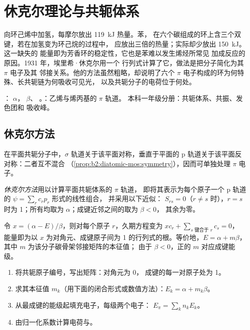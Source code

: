 \chapter{休克尔理论与共轭体系}\label{ch:b2:huckel}

向环己烯中加氢，每摩尔放出 \qty{119}{kJ} 热量。苯，
在六个碳组成的环上含三个双键，若在加氢变为环己烷的过程中，
应放出三倍的热量；实际却少放出 \qty{150}{kJ}。这一缺失的
能量即为芳香环的稳定性，它也是苯难以发生烯烃所常见
加成反应的原因。1931 年，埃里希·休克尔用一个
行列式计算了它，做法是把分子简化为其 $\pi$ 电子及其
邻接关系。他的方法虽然粗略，却说明了六个 $\pi$
电子构成的环为何特殊、长共轭链为何吸收可见光，
以及共轭分子的电荷位于何处。

\begin{recall}
： $\alpha$， $\beta$、
。：乙烯与烯丙基的 $\pi$ 轨道。
本科一年级分册：共轭体系、共振、发色团和
吸收峰。
\end{recall}

\section{休克尔方法}

在平面共轭分子中，$\sigma$ 轨道关于该平面对称，垂直于平面的 p
轨道关于该平面反对称：二者互不混合
（\cref{prop:b2:diatomic-mos:symmetry}），因而可单独处理 $\pi$
电子。

\begin{definition}[休克尔方法]\label{def:b2:huckel:method}
\emph{休克尔方法}用以计算平面共轭体系的 $\pi$ 轨道，
即将其表示为每个原子一个 p 轨道的 $\psi = \sum_r c_r p_r$ 形式的线性组合，
并采用以下近似： $S_{rs} = 0$（$r \neq s$ 时），$r =
s$ 时为 1；所有均取为 $\alpha$；成键近邻之间的取为 $\beta < 0$，
其余为零。
\end{definition}

令 $x = (\alpha - E)/\beta$，则对每个原子 $r$，久期方程变为
$xc_r + \sum_{s \text{ 键合于 } r} c_s = 0$，
能量即为以 $x$ 为对角元、成键原子间为 1 的行列式的根。等价地，$E =
\alpha + m\beta$，其中 $m$ 为该分子碳骨架邻接矩阵的本征值；
由于 $\beta < 0$，正的 $m$ 对应成键能级。

\begin{method}[休克尔计算]\label{met:b2:huckel:huckel}
\begin{enumerate}
  \item 将共轭原子编号，写出矩阵：对角元为 0，
        成键的每一对原子处为 1。
  \item 求其本征值 $m_k$（用下面的闭合形式或数值方法）：$E_k =
        \alpha + m_k\beta$。
  \item 从最成键的能级起填充电子，每级两个电子：
        $E_\pi = \sum_k n_k E_k$。
  \item 由归一化系数计算电荷与。
\end{enumerate}
\end{method}

